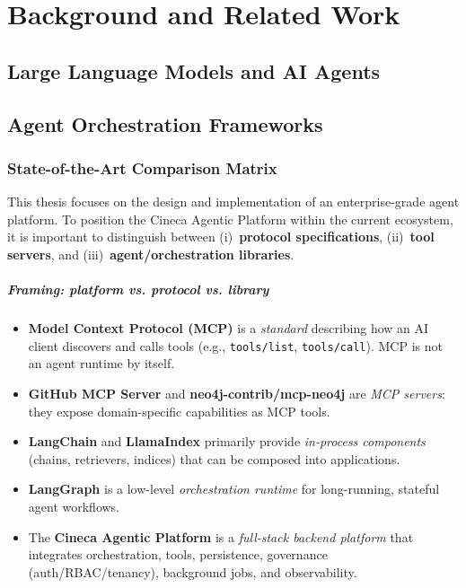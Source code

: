 \documentclass[a4paper,twoside]{sapthesis}
\begin{document}
\chapter{Background and Related Work}
\label{ch:background}


\section{Large Language Models and AI Agents}
\label{sec:llm-agents}

\section{Agent Orchestration Frameworks}
\label{sec:orchestration-frameworks}

\subsection{State-of-the-Art Comparison Matrix}

This thesis focuses on the design and implementation of an enterprise-grade agent platform.
To position the Cineca Agentic Platform within the current ecosystem, it is important to
distinguish between (i) \,\textbf{protocol specifications}, (ii) \,\textbf{tool servers},
and (iii) \,\textbf{agent/orchestration libraries}.

\paragraph{Framing: platform vs. protocol vs. library}
\begin{itemize}
    \item \textbf{Model Context Protocol (MCP)} is a \emph{standard} describing how an AI client discovers and calls tools (e.g., \texttt{tools/list}, \texttt{tools/call}). MCP is not an agent runtime by itself.
    \item \textbf{GitHub MCP Server} and \textbf{neo4j-contrib/mcp-neo4j} are \emph{MCP servers}: they expose domain-specific capabilities as MCP tools.
    \item \textbf{LangChain} and \textbf{LlamaIndex} primarily provide \emph{in-process components} (chains, retrievers, indices) that can be composed into applications.
    \item \textbf{LangGraph} is a low-level \emph{orchestration runtime} for long-running, stateful agent workflows.
    \item The \textbf{Cineca Agentic Platform} is a \emph{full-stack backend platform} that integrates orchestration, tools, persistence, governance (auth/RBAC/tenancy), background jobs, and observability.
\end{itemize}
\end{document}
